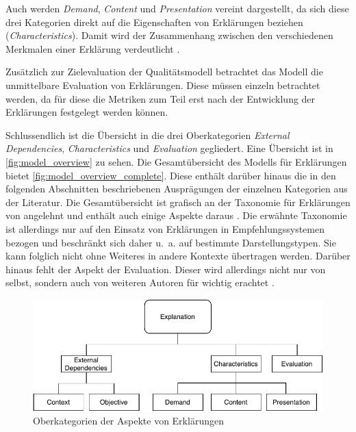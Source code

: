Auch werden \textit{Demand}, \textit{Content} und \textit{Presentation} vereint dargestellt, da sich diese drei Kategorien direkt auf die Eigenschaften von Erklärungen beziehen (\textit{Characteristics}). Damit wird der Zusammenhang zwischen den verschiedenen Merkmalen einer Erklärung verdeutlicht \cite{nunes_systematic_2017}.

Zusätzlich zur Zielevaluation der Qualitätsmodell betrachtet das Modell die unmittelbare Evaluation von Erklärungen. Diese müssen einzeln betrachtet werden, da für diese die Metriken zum Teil erst nach der Entwicklung der Erklärungen festgelegt werden können.

\smallbreak

Schlussendlich ist die Übersicht in die drei Oberkategorien \textit{External Dependencies}, \textit{Characteristics} und \textit{Evaluation} gegliedert. Eine Übersicht ist in \autoref{fig:model_overview} zu sehen. Die Gesamtübersicht des Modells für Erklärungen bietet \autoref{fig:model_overview_complete}. Diese enthält darüber hinaus die in den folgenden Abschnitten beschriebenen Ausprägungen der einzelnen Kategorien aus der Literatur. Die Gesamtübersicht ist grafisch an der Taxonomie für Erklärungen von \citeauthor{nunes_systematic_2017} angelehnt und enthält auch einige Aspekte daraus \cite{nunes_systematic_2017}. Die erwähnte Taxonomie ist allerdings nur auf den Einsatz von Erklärungen in Empfehlungssystemen bezogen und beschränkt sich daher u.~a. auf bestimmte Darstellungstypen. Sie kann folglich nicht ohne Weiteres in andere Kontexte übertragen werden. Darüber hinaus fehlt der Aspekt der Evaluation. Dieser wird allerdings nicht nur von \citeauthor{nunes_systematic_2017} selbst, sondern auch von weiteren Autoren für wichtig erachtet \cite{cirqueira_scenario-based_2020, martin_evaluating_2021}.

\begin{figure}[htb!]
    \begin{center}
        \includegraphics[width=0.9\linewidth]{contents/05_model_description/res/model-overview.pdf}
    \end{center}
    \caption{Oberkategorien der Aspekte von Erklärungen}
    \label{fig:model_overview}
\end{figure}